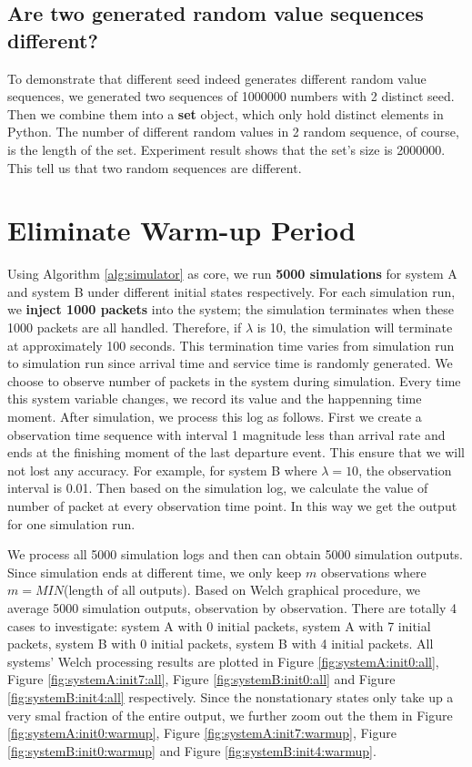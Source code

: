 \documentclass[12pt]{article}  %
\theoremstyle{definition}
\theoremstyle{remark}
\begin{document}
\subsection{Are two generated random value sequences different?}
To demonstrate that different seed indeed generates different random value sequences, we generated two sequences of 1000000 numbers with 2 distinct seed.
Then we combine them into a \textbf{set} object, which only hold distinct elements in Python.
The number of different random values in 2 random sequence, of course, is the length of the set.
Experiment result shows that the set's size is 2000000.
This tell us that two random sequences are different.


\section{Eliminate Warm-up Period}
Using Algorithm \ref{alg:simulator} as core, we run \textbf{5000 simulations} for system A and system B under different initial states respectively.
For each simulation run, we \textbf{inject 1000 packets} into the system;
the simulation terminates when these 1000 packets are all handled.
Therefore, if $\lambda$ is 10, the simulation will terminate at approximately 100 seconds.
This termination time varies from simulation run to simulation run since arrival time and service time is randomly generated.
We choose to observe number of packets in the system during simulation.
Every time this system variable changes, we record its value and the happenning time moment.
After simulation, we process this log as follows.
First we create a observation time sequence with interval 1 magnitude less than arrival rate and ends at the finishing moment of the last departure event.
This ensure that we will not lost any accuracy.
For example, for system B where $\lambda=10$, the observation interval is 0.01.
Then based on the simulation log, we calculate the value of number of packet at every observation time point.
In this way we get the output for one simulation run.

We process all 5000 simulation logs and then can obtain 5000 simulation outputs.
Since simulation ends at different time, we only keep $m$ observations where $m = MIN$(length of all outputs).
Based on Welch graphical procedure, we average 5000 simulation outputs, observation by observation.
There are totally 4 cases to investigate: system A with 0 initial packets, system A with 7 initial packets, system B with 0 initial packets, system B with 4 initial packets.
All systems' Welch processing results are plotted in Figure \ref{fig:systemA:init0:all}, Figure \ref{fig:systemA:init7:all}, Figure \ref{fig:systemB:init0:all} and Figure \ref{fig:systemB:init4:all} respectively.
Since the nonstationary states only take up a very smal fraction of the entire output, we further zoom out the them in Figure \ref{fig:systemA:init0:warmup}, Figure \ref{fig:systemA:init7:warmup}, Figure \ref{fig:systemB:init0:warmup} and Figure \ref{fig:systemB:init4:warmup}.
\end{document}
